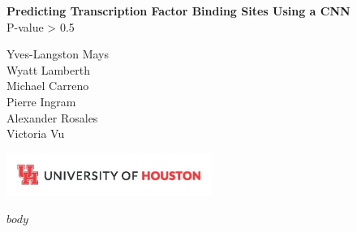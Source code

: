 \documentclass{report}
\begin{document}
\begin{titlepage}
    \centering
    \vspace*{5cm}
    
    {\Huge \textbf{Predicting Transcription Factor Binding Sites Using a CNN}} \\[1.5em]
    
    {\Large P-value > 0.5} \\[1.5em]
    
    \begin{center}
        {\large
        Yves-Langston Mays \\
        Wyatt Lamberth \\
        Michael Carreno \\
        Pierre Ingram \\
        Alexander Rosales \\
        Victoria Vu
        }
    \end{center}
    
    \vfill
    \includegraphics[width=0.5\textwidth]{UHLogo_Long.png}
    \vspace{0.8cm}
\end{titlepage}


\begingroup
\let\clearpage\relax
\tableofcontents
\endgroup
\relax
\relax

$body$
\end{document}
